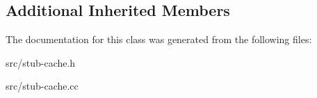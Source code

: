\subsection*{Additional Inherited Members}


The documentation for this class was generated from the following files\+:\begin{DoxyCompactItemize}
\item 
src/stub-\/cache.\+h\item 
src/stub-\/cache.\+cc\end{DoxyCompactItemize}
